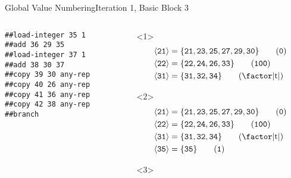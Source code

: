 \documentclass{beamer}
\newcommand{\vn}[1]{\ensuremath{\langle\texttt{#1}\rangle}}
\newcommand{\vreg}[1]{\texttt{#1}}
\begin{document}
\begin{frame}[fragile]{Global Value Numbering}{Iteration 1, Basic Block 3}
  \footnotesize
  \begin{columns}[t,onlytextwidth]
    \begin{column}[t]{.5\textwidth}
      \begin{Verbatim}[frame=single]
##load-integer 35 1
##add 36 29 35
##load-integer 37 1
##add 38 30 37
##copy 39 30 any-rep
##copy 40 26 any-rep
##copy 41 36 any-rep
##copy 42 38 any-rep
##branch
      \end{Verbatim}
    \end{column}
    \begin{column}{.5\textwidth}
      \begin{onlyenv}<1>
        \begin{align*}
          \vn{21} &= \{\vreg{21},
                       \vreg{23},
                       \vreg{25},
                       \vreg{27},
                       \vreg{29},
                       \vreg{30}\} \tag{\texttt{0}} \\
          \vn{22} &= \{\vreg{22},
                       \vreg{24},
                       \vreg{26},
                       \vreg{33}\} \tag{\texttt{100}} \\
          \vn{31} &= \{\vreg{31},
                       \vreg{32},
                       \vreg{34}\} \tag{\text{\factor|t|}}
        \end{align*}
      \end{onlyenv}
      \begin{onlyenv}<2>
        \begin{align*}
          \vn{21} &= \{\vreg{21},
                       \vreg{23},
                       \vreg{25},
                       \vreg{27},
                       \vreg{29},
                       \vreg{30}\} \tag{\texttt{0}} \\
          \vn{22} &= \{\vreg{22},
                       \vreg{24},
                       \vreg{26},
                       \vreg{33}\} \tag{\texttt{100}} \\
          \vn{31} &= \{\vreg{31},
                       \vreg{32},
                       \vreg{34}\} \tag{\text{\factor|t|}} \\
          \vn{35} &= \{\vreg{35}\} \tag{\texttt{1}}
        \end{align*}
      \end{onlyenv}
      \begin{onlyenv}<3>
        \begin{align*}

\end{align*}
\end{onlyenv}
\end{column}
\end{columns}
\end{frame}
\end{document}
